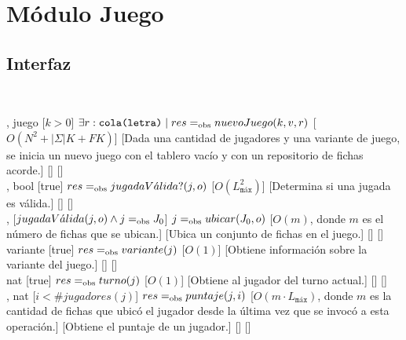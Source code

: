 \section{Módulo Juego}
\begin{interfaz}{\subsection{Interfaz}}
  \\
  \usa{\falta}
  \par\noindent
  \begin{operaciones}
    {
      ,
    }{juego}
    [$k>0$]
    {$\exists r: \texttt{cola(letra)} \mid res =_{\mathrm{obs}} nuevoJuego(k,v,r)$}
    [$O(N^{2}+|\Sigma|K+FK)$]
    [Dada una cantidad de jugadores y una variante de juego, se inicia un nuevo juego con el tablero vacío y con un repositorio de fichas acorde.]
    [\falta]
    [\falta]\\

    \noindent{}
    {
      ,
    }{bool}
    [true]
    {$res=_{\mathrm{obs}} jugadaV\acute{a}lida?(j,o)$}
    [$O(L_{\texttt{máx}}^{2})$]
    [Determina si una jugada es válida.]
    [\falta]
    [\falta]\\

    \noindent{}
    {
      ,
    }{}
    [$jugadaV\acute{a}lida(j,o) \land j=_{\mathrm{obs}} J_{0} $]
    {$j=_{\mathrm{obs}} ubicar(J_{0},o)$}
    [$O(m)$, donde $m$ es el número de fichas que se ubican.]
    [Ubica un conjunto de fichas en el juego.]
    [\falta]
    [\falta]\\

    \noindent{}
    {
    }{variante}
    [true]
    {$res=_{\mathrm{obs}} variante(j)$}
    [$O(1)$]
    [Obtiene información sobre la variante del juego.]
    [\falta]
    [\falta]\\

    \noindent{}
    {
    }{nat}
    [true]
    {$res=_{\mathrm{obs}} turno(j)$}
    [$O(1)$]
    [Obtiene al jugador del turno actual.]
    [\falta]
    [\falta]\\

    \noindent{}
    {
      ,
    }{nat}
    [$i < \#jugadores(j)$]
    {$res=_{\mathrm{obs}} puntaje(j,i)$}
    [$O(m\cdot L_{\texttt{máx}})$, donde $m$ es la cantidad de fichas que ubicó el
jugador desde la última vez que se invocó a esta operación.]
    [Obtiene el puntaje de un jugador.]
    [\falta]
    [\falta]\\


\end{operaciones}
\end{interfaz}
